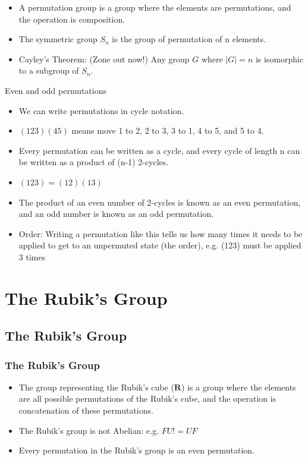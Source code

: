 \documentclass[xcolor=pdftex,dvipsnames,table]{beamer}
\begin{document}
\begin{frame}
  \begin{itemize}
    \item A permutation group is a group where the elements are permutations, and the operation is composition.
    \item The symmetric group $S_n$ is the group of permutation of n elements.
    \item Cayley's Theorem: (Zone out now!) Any group $G$ where $|G|=n$ is isomorphic to a subgroup of $S_n$.
  \end{itemize}
\end{frame}

\begin{frame}
  Even and odd permutations
  \begin{itemize}
    \item We can write permutations in cycle notation. 
    \item $(123)(45)$ means move 1 to 2, 2 to 3, 3 to 1, 4 to 5, and 5 to 4.
    \item Every permutation can be written as a cycle, and every cycle of length n can be written as a product of (n-1) 2-cycles.
    \item $(123) = (12)(13)$
    \item The product of an even number of 2-cycles is known as an even permutation, and an odd number is known as an odd permutation.
    \item Order: Writing a permutation like this tells us how many times it needs to be applied to get to an unpermuted state (the order), e.g. (123) must be applied 3 times
  \end{itemize}
\end{frame}

\section{The Rubik's Group}
\subsection{The Rubik's Group}
\begin{frame}
  \frametitle{The Rubik's Group}
  \begin{itemize}
    \item The group representing the Rubik's cube ($ \mathbf{R} $) is a group where the elements are all possible permutations of the Rubik's cube, and the operation is concatenation of these permutations.
    \item The Rubik's group is not Abelian: e.g. $FU != UF$
    \item Every permutation in the Rubik's group is an even permutation.
  \end{itemize}
\end{frame}
\end{document}
